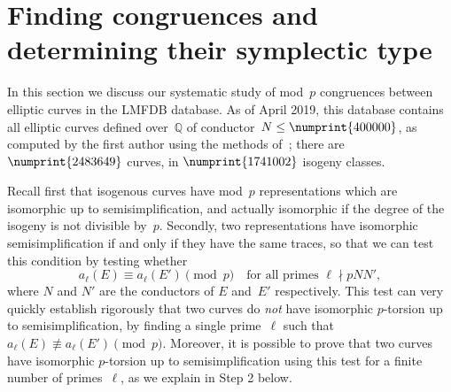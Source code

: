 \documentclass[12pt, reqno]{amsart}
\newcommand{\Q}{\mathbb{Q}}
\numberwithin{equation}{section}
\theoremstyle{definition}
\theoremstyle{remark}
\begin{document}
\section{Finding congruences and determining their symplectic type}\label{S:statistics}

In this section we discuss our systematic study of mod~$p$ congruences
between elliptic curves in the LMFDB database.  As of April 2019, this
database contains all elliptic curves defined over~$\Q$ of
conductor~$N\le\numprint{400000}$, as computed by the first author
using the methods of~\cite{AMEC}; there are $\numprint{2483649}$
curves, in $\numprint{1741002}$ isogeny classes.


Recall first that isogenous curves have mod~$p$ representations which
are isomorphic up to semisimplification, and actually isomorphic if
the degree of the isogeny is not divisible by~$p$.  Secondly, two
representations have isomorphic semisimplification if and only if they
have the same traces, so that we can test this condition by testing
whether
\[ a_{\ell}(E)\equiv a_{\ell}(E')\pmod{p}
\quad \text{for all primes } \ell \nmid pNN',
\] 
where $N$ and $N'$ are the conductors of $E$
and~$E'$ respectively.  This test can very quickly establish rigorously
that two curves do \emph{not} have isomorphic $p$-torsion up to
semisimplification, by finding  a single
prime~$\ell$ such that $a_{\ell}(E)\not\equiv a_{\ell}(E')\pmod{p}$.
Moreover, it is possible to prove that two curves have isomorphic $p$-torsion up to
semisimplification using this test for a finite number of
primes~$\ell$, as we explain in Step 2 below.
\end{document}
